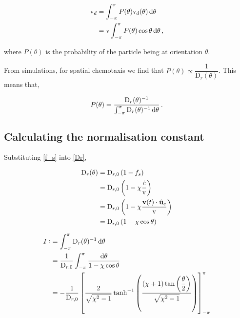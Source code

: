 \documentclass[a4wide,11pt]{article}
\begin{document}
\begin{equation}
    \begin{aligned}
        \mathrm{v}_d &= \int_{-\pi}^{\pi} P(\theta) \mathrm{v}_d(\theta) \dif \theta \\
                  &= \mathrm{v} \int_{-\pi}^{\pi} P(\theta) \cos \theta \dif \theta \,,
    \end{aligned}
    \label{drift_master}
\end{equation}

where $P(\theta)$ is the probability of the particle being at orientation $\theta$.

From simulations, for spatial chemotaxis we find that $P(\theta) \propto \dfrac{1}{\mathrm{D}_r(\theta)}$. This means that,

\begin{equation}
    P(\theta) = \dfrac{\mathrm{D}_r(\theta)^{-1}}{\int_{-\pi}^{\pi} \mathrm{D}_r(\theta)^{-1} \dif \theta} \,.
    \label{P}
\end{equation}

\subsection*{Calculating the normalisation constant}

Substituting \cref{f_s} into \cref{Dr},

\begin{equation}
    \begin{aligned}
        \mathrm{D}_r(\theta) &= \mathrm{D}_{r,0} \del{1 - f_s} \\
                    &= \mathrm{D}_{r,0} \del{1 - \chi \dfrac{\dot{c}}{\mathrm{v}}} \\
                    &= \mathrm{D}_{r,0} \del{1 - \chi \dfrac{\mathbf{v}(t) \cdot \hat{\mathbf{u}}_c}{\mathrm{v}}} \\
                    &= \mathrm{D}_{r,0} \del{1 - \chi \cos\theta} \\
    \end{aligned}
    \label{Dr_s}
\end{equation}

\begin{equation}
    \begin{aligned}
       I :&= \int_{-\pi}^{\pi} \mathrm{D}_r(\theta)^{-1} \dif \theta \\
          &= \dfrac{1}{\mathrm{D}_{r,0}} \int_{-\pi}^\pi \dfrac{\dif \theta}{1 - \chi \cos \theta} \\
          &= -\dfrac{1}{\mathrm{D}_{r,0}} \left[ \dfrac{2}{\sqrt{\chi^2 - 1}} \tanh^{-1} \del{ \dfrac{\del{\chi + 1} \tan \del{\dfrac{\theta}{2}}}{\sqrt{\chi^2 - 1}} } \right]_{-\pi}^\pi \\
    \end{aligned}
    \label{I_norm}
\end{equation}
\end{document}

